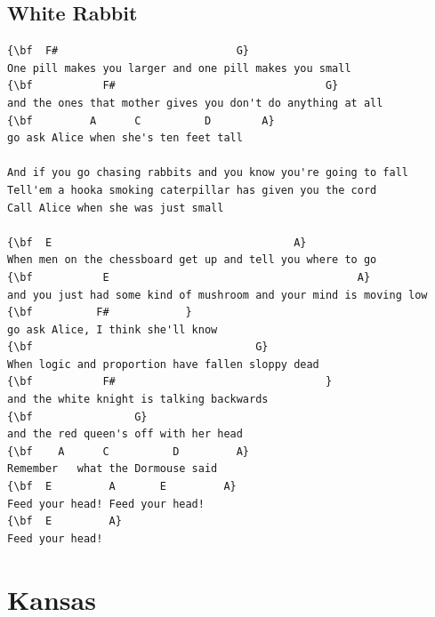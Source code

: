 \documentclass[a4paper]{article}
\begin{document}
\subsection{White Rabbit}
\begin{Verbatim}[commandchars=\\\{\}]
{\bf  F#                            G}
One pill makes you larger and one pill makes you small
{\bf           F#                                 G}
and the ones that mother gives you don't do anything at all
{\bf         A      C          D        A}
go ask Alice when she's ten feet tall

And if you go chasing rabbits and you know you're going to fall
Tell'em a hooka smoking caterpillar has given you the cord
Call Alice when she was just small

{\bf  E                                      A}
When men on the chessboard get up and tell you where to go
{\bf           E                                       A}
and you just had some kind of mushroom and your mind is moving low
{\bf          F#            }
go ask Alice, I think she'll know
{\bf                                   G}
When logic and proportion have fallen sloppy dead
{\bf           F#                                 }
and the white knight is talking backwards 
{\bf                G}
and the red queen's off with her head
{\bf    A      C          D         A}
Remember   what the Dormouse said
{\bf  E         A       E         A}
Feed your head! Feed your head!
{\bf  E         A}
Feed your head!

\end{Verbatim}
\newpage
\section{Kansas}
\end{document}
